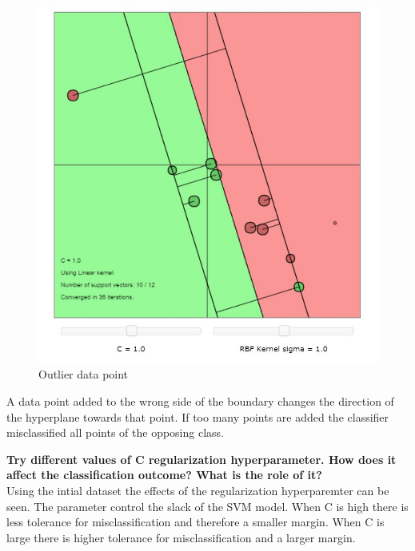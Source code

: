 \documentclass[11pt,oneside,a4paper]{article}
\begin{document}
\begin{figure}[H]
	 \centering
	\includegraphics[scale=0.5]{../Figures/misclassified_linear_kernal}
	\caption{Outlier data point}
\end{figure}

A data point added to the wrong side of the boundary changes the direction of the hyperplane towards that point. If too many points are added the classifier misclassified all points of the opposing class. 

\textbf{Try different values of C regularization hyperparameter. How does it affect the classification outcome? What is the role of it?}\\
Using the intial dataset the effects of the regularization hyperparemter can be seen. The parameter control the slack of the SVM model. When C is high there is less tolerance for misclassification and therefore a smaller margin. When C is large there is higher tolerance for misclassification and a larger margin.
\end{document}
